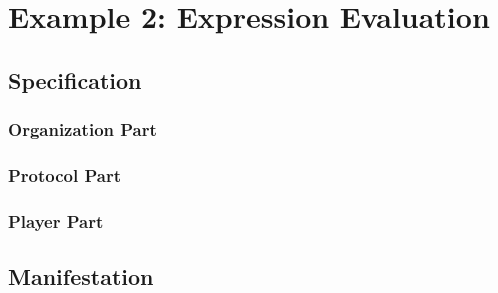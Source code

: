 
\section{Example 2: Expression Evaluation}

\subsection*{Specification}

\subsubsection*{Organization Part}

\subsubsection*{Protocol Part}

\subsubsection*{Player Part}

\subsection*{Manifestation}